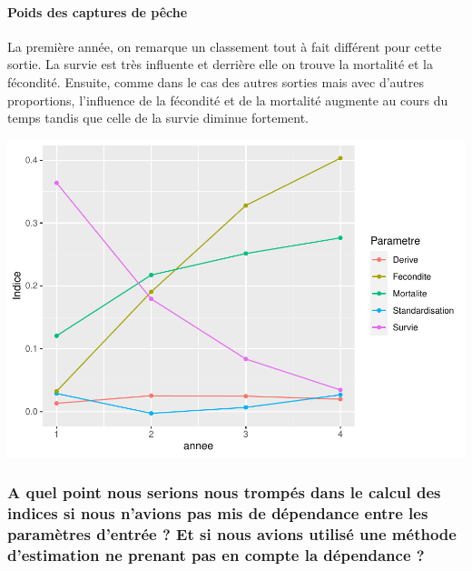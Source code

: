 \documentclass[
]{article}
\begin{document}
\hypertarget{poids-des-captures-de-puxeache-2}{%
\paragraph{Poids des captures de
pêche}\label{poids-des-captures-de-puxeache-2}}

La première année, on remarque un classement tout à fait différent pour
cette sortie. La survie est très influente et derrière elle on trouve la
mortalité et la fécondité. Ensuite, comme dans le cas des autres sorties
mais avec d'autres proportions, l'influence de la fécondité et de la
mortalité augmente au cours du temps tandis que celle de la survie
diminue fortement.

\includegraphics{rapport_files/figure-latex/aoao-1.pdf}

\hypertarget{a-quel-point-nous-serions-nous-trompuxe9s-dans-le-calcul-des-indices-si-nous-navions-pas-mis-de-duxe9pendance-entre-les-paramuxe8tres-dentruxe9e-et-si-nous-avions-utilisuxe9-une-muxe9thode-destimation-ne-prenant-pas-en-compte-la-duxe9pendance}{%
\subsubsection{A quel point nous serions nous trompés dans le calcul des
indices si nous n'avions pas mis de dépendance entre les paramètres
d'entrée ? Et si nous avions utilisé une méthode d'estimation ne prenant
pas en compte la dépendance
?}\label{a-quel-point-nous-serions-nous-trompuxe9s-dans-le-calcul-des-indices-si-nous-navions-pas-mis-de-duxe9pendance-entre-les-paramuxe8tres-dentruxe9e-et-si-nous-avions-utilisuxe9-une-muxe9thode-destimation-ne-prenant-pas-en-compte-la-duxe9pendance}}
\end{document}
